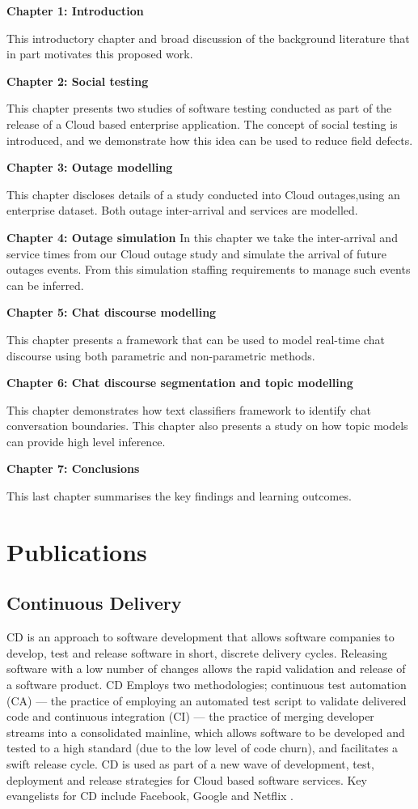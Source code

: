 \textbf{Chapter 1: Introduction}

This introductory chapter and broad discussion of the background literature that in part motivates this proposed work.

\textbf{Chapter 2: Social testing}

This chapter presents two studies of software testing conducted as part of the release of a Cloud based enterprise application. The concept of social testing is introduced, and we demonstrate how this idea can be used to reduce field defects.

\textbf{Chapter 3: Outage modelling}

This chapter discloses details of a study conducted into Cloud outages,using an enterprise dataset. Both outage inter-arrival and services are modelled.

\textbf{Chapter 4: Outage simulation}
In this chapter we take the inter-arrival and service times from our Cloud outage study and simulate the arrival of future outages events. From this simulation staffing requirements to manage such events can be inferred. 

\textbf{Chapter 5: Chat discourse modelling}

This chapter presents a framework that can be used to model real-time chat discourse using both parametric and non-parametric methods.

\textbf{Chapter 6: Chat discourse segmentation and topic modelling}

This chapter demonstrates how text classifiers framework to identify chat conversation boundaries. This chapter also presents a study on how topic models can provide high level inference. 

\textbf{Chapter 7: Conclusions}

This last chapter summarises the key findings and learning outcomes.

\section{Publications} 

\subsection{Continuous Delivery}
CD is an approach to software development that allows software companies to develop, test and release software in short, discrete delivery cycles. Releasing software with a low number of changes allows the rapid validation and release of a software product. CD Employs two methodologies; continuous test automation (CA) ---  the practice of employing an automated test script to validate delivered code and continuous integration (CI) --- the practice of merging developer streams into a consolidated mainline, which allows software to be developed and tested to a high standard (due to the low level of code churn), and facilitates a swift release cycle. CD is used as part of a new wave of development, test, deployment and release strategies for Cloud based software services. Key evangelists for CD include Facebook, Google and Netflix \cite{quora2014}. 

